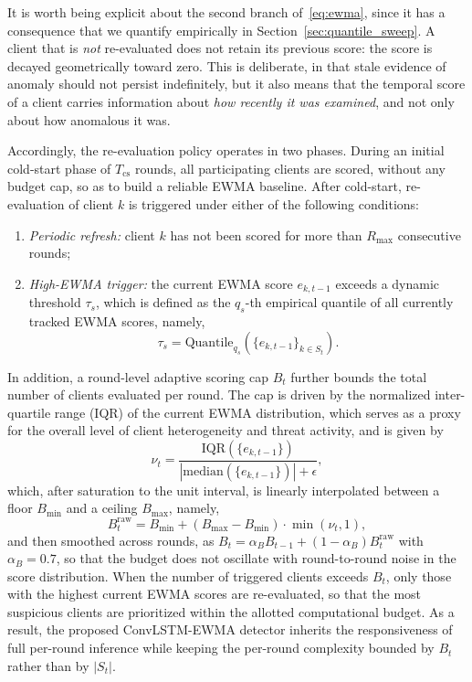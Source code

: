 \documentclass[journal]{IEEEtran}
\begin{document}
It is worth being explicit about the second branch of~\eqref{eq:ewma}, since it has a consequence that we quantify empirically in Section~\ref{sec:quantile_sweep}. A client that is \emph{not} re-evaluated does not retain its previous score: the score is decayed geometrically toward zero. This is deliberate, in that stale evidence of anomaly should not persist indefinitely, but it also means that the temporal score of a client carries information about \emph{how recently it was examined}, and not only about how anomalous it was.

Accordingly, the re-evaluation policy operates in two phases. During an initial cold-start phase of $T_{\mathrm{cs}}$ rounds, all participating clients are scored, without any budget cap, so as to build a reliable EWMA baseline. After cold-start, re-evaluation of client $k$ is triggered under either of the following conditions:
\begin{enumerate}
    \item \textit{Periodic refresh:} client $k$ has not been scored for more than $R_{\max}$ consecutive rounds;
    \item \textit{High-EWMA trigger:} the current EWMA score $e_{k,t-1}$ exceeds a dynamic threshold $\tau_s$, which is defined as the $q_s$-th empirical quantile of all currently tracked EWMA scores, namely,
    \begin{equation}
    \tau_s = \text{Quantile}_{q_s}\!\left(\{e_{k,t-1}\}_{k \in S_t}\right).
    \label{eq:trigger_threshold}
    \end{equation}
\end{enumerate}

In addition, a round-level adaptive scoring cap $B_t$ further bounds the total number of clients evaluated per round. The cap is driven by the normalized inter-quartile range (IQR) of the current EWMA distribution, which serves as a proxy for the overall level of client heterogeneity and threat activity, and is given by
\begin{equation}
\nu_t = \frac{\mathrm{IQR}(\{e_{k,t-1}\})}{|\mathrm{median}(\{e_{k,t-1}\})| + \epsilon},
\label{eq:iqr_ratio}
\end{equation}
which, after saturation to the unit interval, is linearly interpolated between a floor $B_{\min}$ and a ceiling $B_{\max}$, namely,
\begin{equation}
B_t^{\mathrm{raw}} = B_{\min} + (B_{\max} - B_{\min}) \cdot \min(\nu_t, 1),
\label{eq:scoring_cap}
\end{equation}
and then smoothed across rounds, as $B_t = \alpha_B B_{t-1} + (1-\alpha_B) B_t^{\mathrm{raw}}$ with $\alpha_B = 0.7$, so that the budget does not oscillate with round-to-round noise in the score distribution. When the number of triggered clients exceeds $B_t$, only those with the highest current EWMA scores are re-evaluated, so that the most suspicious clients are prioritized within the allotted computational budget. As a result, the proposed ConvLSTM-EWMA detector inherits the responsiveness of full per-round inference while keeping the per-round complexity bounded by $B_t$ rather than by $|S_t|$.
\end{document}
